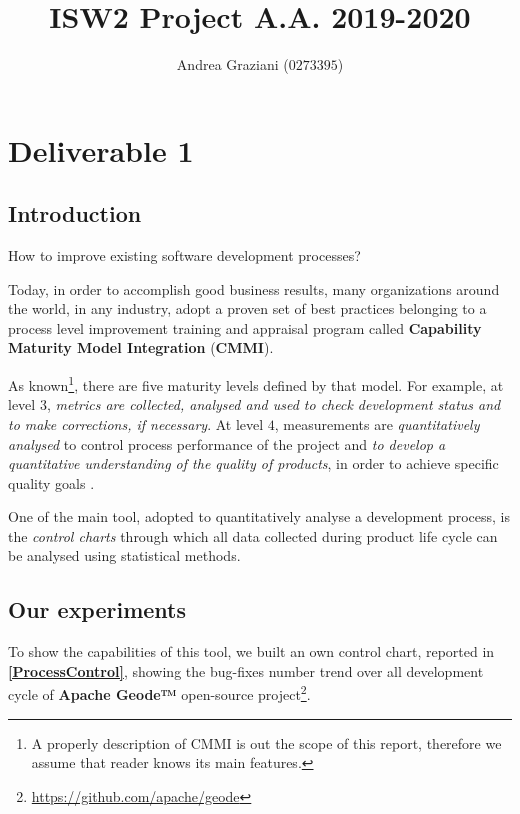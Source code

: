 \documentclass[sigconf]{acmart}
\begin{document}
\title{ISW2 Project A.A. 2019-2020}

\author{Andrea Graziani ($0273395$)}

\maketitle
\section{Deliverable 1}

\subsection{Introduction}

How to improve existing software development processes?

Today, in order to accomplish good business results, many organizations around the world, in any industry, adopt a proven set of best practices belonging to a process level improvement training and appraisal program called \textbf{Capability Maturity Model Integration} (\textbf{CMMI})\cite{CMMIINSTITUTE}.

As known\footnote{A properly description of CMMI is out the scope of this report, therefore we assume that reader knows its main features.}, there are five maturity levels defined by that model. For example, at level $3$, \textit{metrics are collected, analysed and used to check development status and to make corrections, if necessary}. At level $4$, measurements are \textit{quantitatively analysed} to control process performance of the project and \textit{to develop a quantitative understanding of the quality of products}, in order to achieve specific quality goals \cite{FLORENCE}.

One of the main tool, adopted to quantitatively analyse a development process, is the \textit{control charts} 
through which all data collected during product life cycle can be analysed using statistical methods\cite{FLORENCE}.

\subsection{Our experiments}

To show the capabilities of this tool, we built an own control chart, reported in \textbf{\cref{ProcessControl}}, showing the bug-fixes number trend over all development cycle of \textbf{Apache Geode™} open-source project\footnote{\url{https://github.com/apache/geode}}.
\end{document}
